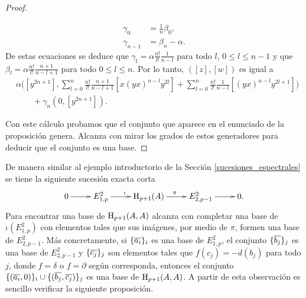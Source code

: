 \documentclass[fleqn,../tesis.tex]{subfiles}
\begin{document}
\begin{proof}
\begin{itemize}
\begin{align*}
        \gamma_0 &= \frac{1}{n}\beta_0,\\
        \gamma_{n - 1} &= \beta_n - \alpha.     
    \end{align*}
    De estas ecuaciones se deduce que $\gamma_l = \alpha \frac{n!}{l!} \frac{1}{n - l}$ para todo $l$, $0 \leq l \leq n - 1$ y
    que $\beta_l  = \alpha \frac{n!}{l!} \frac{n + 1}{n - l + 1}$ para todo $0 \leq l \leq n$. Por lo tanto, $([z], [w])$ es igual a
    \begin{align*}
     &\alpha \Bigg(\left[y^{2n + 1}\right],
            \sum_{l = 0}^{n}\frac{n!}{l!} \frac{n + 1}{n - l + 1}\left[x(yx)^{n -l}y^{2l}\right]
                + \sum_{l = 0}^{n}\frac{n!}{l!}\frac{1}{n - l}\left[(yx)^{n - l}y^{2l + 1}\right]\Bigg)\\
      &\qquad + \gamma_n \left(0, \left[y^{2n + 1}\right]\right).
    \end{align*}
    \end{itemize}
    Con este cálculo probamos que el conjunto que aparece en el enunciado de la proposición genera. Alcanza
    con mirar los grados de estos generadores para deducir que el conjunto es una base.
\end{proof}

De manera similar al ejemplo introductorio de la Sección \ref{sucesiones_espectrales} se tiene la siguiente sucesión
exacta corta
\begin{align*}
\xymatrix{
    0 \ar[r] & E_{1, p}^{2} \ar[r]^{\iota} & \Hy_{p + 1}(A) \ar[r]^{\pi} & E_{2, p - 1}^{2} \ar[r] & 0.
}
\end{align*}
Para encontrar una
base de $\operatorname{H}_{p + 1}(A, A)$ alcanza con completar una base de $\iota\left(E_{1, p}^{2}\right)$ con elementos
tales que sus imágenes, por medio de $\pi$, formen una base de $E_{2, p - 1}^{2}$. Más concretamente, si $\{\overline{a_i}\}_i$
es una base de $E_{1, p}^{2}$, el conjunto $\{\overline{b_j}\}_j$ es una base de $E_{2, p - 1}^{2}$ y $\{\overline{c_j}\}_j$ son
elementos tales que $f(c_j) = -d(b_j)$ para todo $j$, donde $f = \delta$ o $f = \partial$ según corresponda, entonces 
el conjunto $\{(\overline{a_i}, 0)\}_i \cup \{(\overline{b_j}, \overline{c_j})\}_j$ es una base de $\operatorname{H}_{p + 1}(A, A)$. A partir
de esta observación es sencillo verificar la siguiente proposición.
\end{document}
